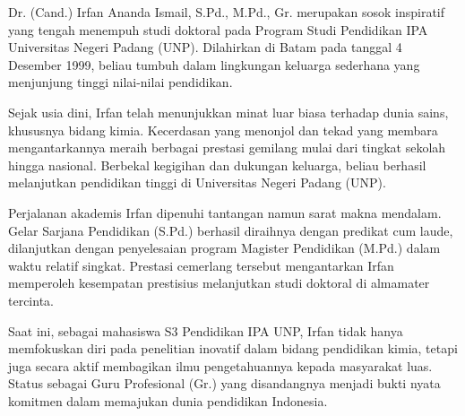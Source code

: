 \documentclass[12pt,a4paper,oneside]{book}
\begin{document}
{\fontsize{14}{16}\selectfont

Dr. (Cand.) Irfan Ananda Ismail, S.Pd., M.Pd., Gr. merupakan sosok inspiratif yang tengah menempuh studi doktoral pada Program Studi Pendidikan IPA Universitas Negeri Padang (UNP). Dilahirkan di Batam pada tanggal 4 Desember 1999, beliau tumbuh dalam lingkungan keluarga sederhana yang menjunjung tinggi nilai-nilai pendidikan.

Sejak usia dini, Irfan telah menunjukkan minat luar biasa terhadap dunia sains, khususnya bidang kimia. Kecerdasan yang menonjol dan tekad yang membara mengantarkannya meraih berbagai prestasi gemilang mulai dari tingkat sekolah hingga nasional. Berbekal kegigihan dan dukungan keluarga, beliau berhasil melanjutkan pendidikan tinggi di Universitas Negeri Padang (UNP).

Perjalanan akademis Irfan dipenuhi tantangan namun sarat makna mendalam. Gelar Sarjana Pendidikan (S.Pd.) berhasil diraihnya dengan predikat cum laude, dilanjutkan dengan penyelesaian program Magister Pendidikan (M.Pd.) dalam waktu relatif singkat. Prestasi cemerlang tersebut mengantarkan Irfan memperoleh kesempatan prestisius melanjutkan studi doktoral di almamater tercinta.

Saat ini, sebagai mahasiswa S3 Pendidikan IPA UNP, Irfan tidak hanya memfokuskan diri pada penelitian inovatif dalam bidang pendidikan kimia, tetapi juga secara aktif membagikan ilmu pengetahuannya kepada masyarakat luas. Status sebagai Guru Profesional (Gr.) yang disandangnya menjadi bukti nyata komitmen dalam memajukan dunia pendidikan Indonesia.

}

\titleformat{\chapter}[display]{\normalfont\huge\bfseries}{\chaptertitlename\ \thechapter}{20pt}{\Huge}
\titlespacing{\chapter}{0pt}{50pt}{40pt}


\end{document}
